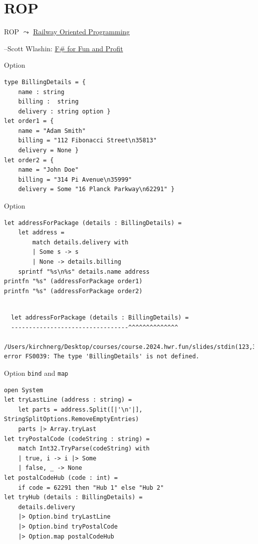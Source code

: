 \documentclass[t]{beamer}
\begin{document}
\section{ROP }
\label{sec:org8df510f}
\begin{frame}[label={sec:org0904c04}]{ROP}
\(\leadsto\) \href{./2 Railway Oriented Programming.pdf}{Railway Oriented Programming}

\null\hfill--Scott Wlashin: \href{https://fsharpforfunandprofit.com/rop/}{F\# for Fun and Profit}
\end{frame}

\begin{frame}[label={sec:orgad3bcb9},fragile]{Option}
 \begin{verbatim}
type BillingDetails = { 
    name : string
    billing :  string
    delivery : string option }
let order1 = {
    name = "Adam Smith"
    billing = "112 Fibonacci Street\n35813" 
    delivery = None }
let order2 = {
    name = "John Doe"
    billing = "314 Pi Avenue\n35999"
    delivery = Some "16 Planck Parkway\n62291" }
\end{verbatim}
\end{frame}

\begin{frame}[label={sec:orgb32382a},fragile]{Option}
 \begin{verbatim}
let addressForPackage (details : BillingDetails) = 
    let address =
        match details.delivery with 
        | Some s -> s
        | None -> details.billing
    sprintf "%s\n%s" details.name address
printfn "%s" (addressForPackage order1)
printfn "%s" (addressForPackage order2)
\end{verbatim}

\begin{verbatim}

  let addressForPackage (details : BillingDetails) = 
  ---------------------------------^^^^^^^^^^^^^^

/Users/kirchnerg/Desktop/courses/course.2024.hwr.fun/slides/stdin(123,34): error FS0039: The type 'BillingDetails' is not defined.
\end{verbatim}
\end{frame}

\begin{frame}[label={sec:org5bcea19},fragile]{Option \texttt{bind} and \texttt{map}}
 \begin{verbatim}
open System
let tryLastLine (address : string) = 
    let parts = address.Split([|'\n'|], StringSplitOptions.RemoveEmptyEntries)
    parts |> Array.tryLast
let tryPostalCode (codeString : string) = 
    match Int32.TryParse(codeString) with 
    | true, i -> i |> Some
    | false, _ -> None
let postalCodeHub (code : int) = 
    if code = 62291 then "Hub 1" else "Hub 2"
let tryHub (details : BillingDetails) = 
    details.delivery
    |> Option.bind tryLastLine 
    |> Option.bind tryPostalCode 
    |> Option.map postalCodeHub
\end{verbatim}
\end{frame}
\end{document}
